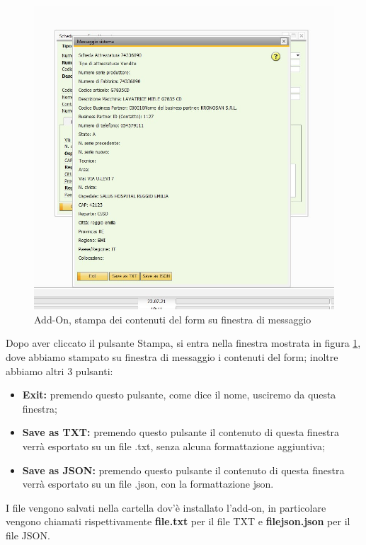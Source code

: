 \begin{figure}[!h] 
	\centering 
	\includegraphics[scale = 0.6]{immagini/add-on/addon-stampa.jpg} 
	\caption{Add-On, stampa dei contenuti del form su finestra di messaggio}
	\label{fig:4-6}
\end{figure}

	
	Dopo aver cliccato il pulsante Stampa, si entra nella finestra mostrata in figura \ref{fig:4-6}, dove abbiamo stampato su finestra di messaggio i contenuti del form; inoltre abbiamo altri 3 pulsanti:

\begin{itemize}
	\item \textbf{Exit:} premendo questo pulsante, come dice il nome, usciremo da questa finestra;
	\item \textbf{Save as TXT:} premendo questo pulsante il contenuto di questa finestra verrà esportato su un file .txt, senza alcuna formattazione aggiuntiva;
	\item \textbf{Save as JSON:} premendo questo pulsante il contenuto di questa finestra verrà esportato su un file .json, con la formattazione json.
\end{itemize}


	I file vengono salvati nella cartella dov'è installato l'add-on, in particolare vengono chiamati rispettivamente \textbf{file.txt} per il file TXT e \textbf{filejson.json} per il file JSON.
	
